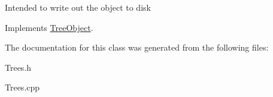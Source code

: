 Intended to write out the object to disk 

Implements \mbox{\hyperlink{classTreeObject_abf2bf88337bec961784b5dfeb9b795ed}{Tree\+Object}}.



The documentation for this class was generated from the following files\+:\begin{DoxyCompactItemize}
\item 
Trees.\+h\item 
Trees.\+cpp\end{DoxyCompactItemize}
